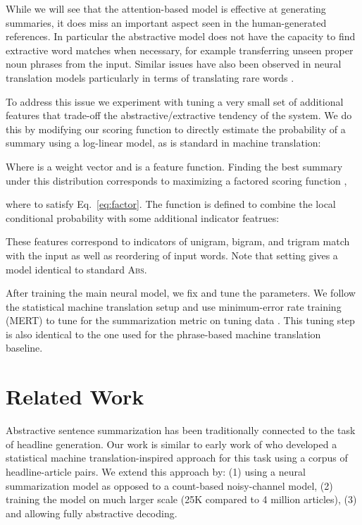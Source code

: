 \documentclass[11pt,a4paper]{article}
\begin{document}
While we will see that the attention-based model is effective at
generating summaries, it does miss an important aspect seen in
the human-generated references. In particular the abstractive model
does not have the capacity to find extractive word matches when
necessary, for example transferring unseen proper noun phrases from the
input. Similar issues have also been observed in neural
translation models particularly in terms of translating rare words
\cite{luong2014addressing}.


To address this issue we experiment with tuning a very small set of
additional features that trade-off the abstractive/extractive 
tendency of the system. We do this by modifying our scoring function to 
directly estimate the probability of a summary using a log-linear model,
as is standard in machine translation:


\noindent Where  is a weight vector and  is a feature function. Finding the best summary under this distribution corresponds to maximizing a factored scoring function ,

\noindent where  to satisfy Eq.~\ref{eq:factor}.
The function  is defined to combine the local conditional probability with some additional indicator featrues:  


\noindent These features correspond to indicators of unigram, bigram, and trigram match with the input as well as reordering of input words. Note that setting  gives a model identical to standard \textsc{Abs}.  



After training the main neural model, we fix  and tune the  parameters. We
follow the statistical machine translation setup and use minimum-error
rate training (MERT) to tune for the summarization metric on tuning
data \cite{och2003minimum}. This tuning step is also identical to
the one used for the phrase-based machine translation baseline.

 
\section{Related Work}
\label{sec:related}

Abstractive sentence summarization has been traditionally connected to
the task of headline generation.  Our work is similar to early work of
 who developed a statistical machine
translation-inspired approach for this task using a corpus of
headline-article pairs. We extend this approach by: (1) using a neural
summarization model as opposed to a count-based noisy-channel model, (2)
training the model on much larger scale (25K compared to 4 million
articles), (3) and allowing fully abstractive decoding. 
\end{document}
